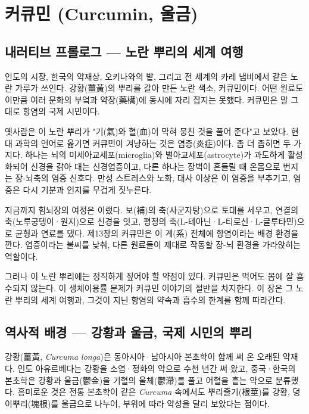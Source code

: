\documentclass[12pt,oneside]{book}
\begin{document}
\chapter{커큐민 (Curcumin, 울금)}

\section{내러티브 프롤로그 — 노란 뿌리의 세계 여행}

인도의 시장, 한국의 약재상, 오키나와의 밭, 그리고 전 세계의 카레 냄비에서 같은 노란 가루가 쓰인다. 강황(薑黃)의 뿌리를 갈아 만든 노란 색소, 커큐민이다. 어떤 원료도 이만큼 여러 문화의 부엌과 약장(藥欌)에 동시에 자리 잡지는 못했다. 커큐민은 말 그대로 항염의 국제 시민이다.

옛사람은 이 노란 뿌리가 "기(氣)와 혈(血)이 막혀 뭉친 것을 풀어 준다"고 보았다. 현대 과학의 언어로 옮기면 커큐민이 겨냥하는 것은 염증(炎症)이다. 좀 더 좁히면 두 가지다. 하나는 뇌의 미세아교세포(microglia)와 별아교세포(astrocyte)가 과도하게 활성화되어 신경을 갉아 대는 신경염증이고, 다른 하나는 장벽이 흔들릴 때 온몸으로 번지는 장-뇌축의 염증 신호다. 만성 스트레스와 노화, 대사 이상은 이 염증을 부추기고, 염증은 다시 기분과 인지를 무겁게 짓누른다.

지금까지 힘뇌장의 여정은 이랬다. 보(補)의 축(사군자탕)으로 토대를 세우고, 연결의 축(노루궁뎅이·원지)으로 신경을 잇고, 평정의 축(L-테아닌·L-티로신·L-글루타민)으로 균형과 연료를 댔다. 제13장의 커큐민은 이 계(系) 전체에 항염이라는 배경 환경을 깐다. 염증이라는 불씨를 낮춰, 다른 원료들이 제대로 작동할 장-뇌 환경을 가라앉히는 역할이다.

그러나 이 노란 뿌리에는 정직하게 짚어야 할 약점이 있다. 커큐민은 먹어도 몸에 잘 흡수되지 않는다. 이 생체이용률 문제가 커큐민 이야기의 절반을 차지한다. 이 장은 그 노란 뿌리의 세계 여행과, 그것이 지닌 항염의 약속과 흡수의 한계를 함께 따라간다.

\section{역사적 배경 — 강황과 울금, 국제 시민의 뿌리}

강황(薑黃, \textit{Curcuma longa})은 동아시아·남아시아 본초학이 함께 써 온 오래된 약재다. 인도 아유르베다는 강황을 소염·정화의 약으로 수천 년간 써 왔고, 중국·한국의 본초학은 강황과 울금(鬱金)을 기혈의 울체(鬱滯)를 풀고 어혈을 흩는 약으로 분류했다. 흥미로운 것은 전통 본초학이 같은 \textit{Curcuma} 속에서도 뿌리줄기(根莖)를 강황, 덩이뿌리(塊根)를 울금으로 나누어, 부위에 따라 약성을 달리 보았다는 점이다.
\end{document}
